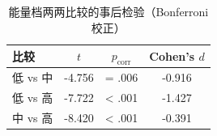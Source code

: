 \begin{table}[htbp]
  \centering
  \caption{能量档两两比较的事后检验（Bonferroni 校正）}
  \label{tab:infer-posthoc}
  \begin{tabular}{lccc}
    \toprule
    比较 & $t$ & $p_{\mathrm{corr}}$ & Cohen's $d$ \\
    \midrule
    低 vs 中 & -4.756 & = .006 & -0.916 \\
    低 vs 高 & -7.722 & < .001 & -1.427 \\
    中 vs 高 & -8.420 & < .001 & -0.391 \\
    \bottomrule
  \end{tabular}
\end{table}
